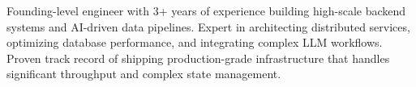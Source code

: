 \documentclass[letter,10pt]{article}
\begin{document}
Founding-level engineer with 3+ years of experience building high-scale backend systems and AI-driven data pipelines. Expert in architecting distributed services, optimizing database performance, and integrating complex LLM workflows. Proven track record of shipping production-grade infrastructure that handles significant throughput and complex state management.
\end{document}
